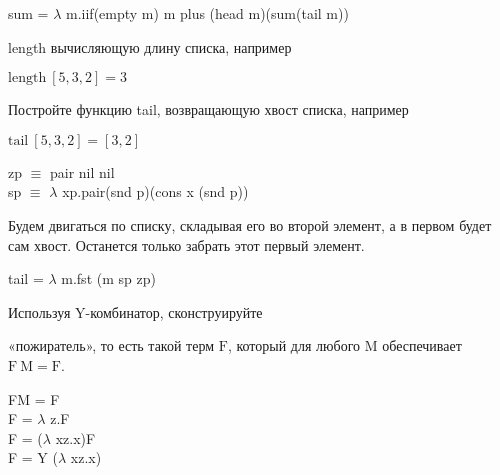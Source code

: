 \documentclass[a4paper,12pt]{article} %
\begin{document}
\begin{enumerate}
\begin{itemize}
{\color{blue}
	\begin{adjustwidth}{1em}{0pt}
	sum = $\lambda$ m.iif(empty m) m plus (head m)(sum(tail m))
	\end{adjustwidth}
}


{\item length вычисляющую длину списка, например
	\begin{center}
	$\mathrm{length \ [5,3,2] = 3}$
\end{center}
}

{\color{blue}
	\begin{adjustwidth}{1em}{0pt}
	\end{adjustwidth}
}

\end{itemize}


{\item Постройте функцию tail, возвращающую хвост списка, например
	\begin{center}
		$\mathrm{tail \ [5,3,2] = [3,2]}$
	\end{center}
}

{\color{blue}
	\begin{adjustwidth}{1em}{0pt}
	zp $\equiv$ pair nil nil \\
	sp $\equiv$ $\lambda$ xp.pair(snd p)(cons x (snd p))

	Будем двигаться по списку, складывая его во второй элемент, а в первом будет сам хвост. Останется только забрать этот первый элемент.

	tail = $\lambda$ m.fst (m sp zp)
	\end{adjustwidth}
}


{\item Используя $\mathrm{Y}$-комбинатор, сконструируйте}
\begin{itemize}
{\item «пожиратель», то есть такой терм $\mathrm{F}$, который для любого $\mathrm{M}$ обеспечивает $\mathrm{F \ M = F}$.}

{\color{blue}
	\begin{adjustwidth}{1em}{0pt}
	FM = F \\
	F = $\lambda$ z.F \\
	F = ($\lambda$ xz.x)F \\
	F = $\mathrm{Y}$ ($\lambda$ xz.x)
	\end{adjustwidth}
}    


\end{itemize}
\end{enumerate}
\end{document}
